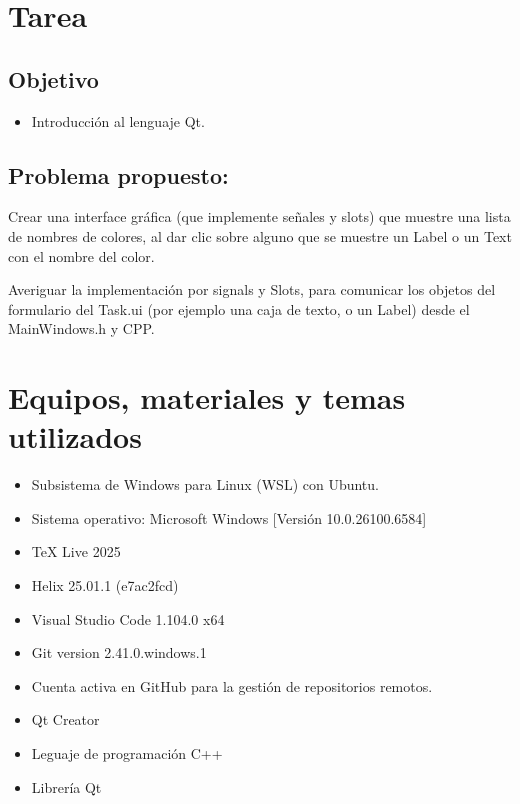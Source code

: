 \section{Tarea}

\subsection{Objetivo}

\begin{itemize}
    \item Introducción al lenguaje Qt.
\end{itemize}



\subsection{Problema propuesto: }

\begin{enumerate}[label={[\arabic*]}]
    \item Crear una interface gráfica (que implemente señales y slots) que muestre una lista de nombres de colores, al dar clic sobre alguno que se muestre un Label o un Text con el nombre del color.
    \item Averiguar la implementación por signals y Slots, para comunicar los objetos del formulario del Task.ui (por ejemplo una caja de texto, o un Label) desde el MainWindows.h y CPP.
\end{enumerate}




\section{Equipos, materiales y temas utilizados}

\begin{itemize}
    \item Subsistema de Windows para Linux (WSL) con Ubuntu.
    \item Sistema operativo: Microsoft Windows [Versión 10.0.26100.6584]
    \item TeX Live 2025
    \item Helix 25.01.1 (e7ac2fcd)
    \item Visual Studio Code 1.104.0 x64
    \item Git version 2.41.0.windows.1
    \item Cuenta activa en GitHub para la gestión de repositorios remotos.
    \item Qt Creator
    \item Leguaje de programación C++
    \item Librería Qt
\end{itemize}




